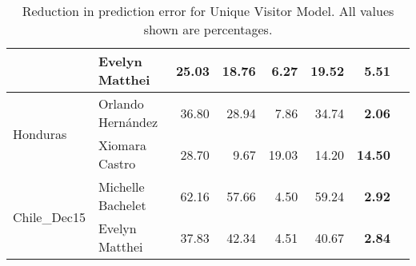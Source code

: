 \begin{table*}
\begin{tabular}{| l | l | r | r | r | r | r | r |}
														  & Evelyn Matthei & 25.03 & 18.76 & 6.27 & 19.52 & \textbf{5.51} \\
		\hline 
		\multirow{2}{*}{Honduras} & Orlando Hern\'{a}ndez & 36.80 & 28.94 & 7.86 & 34.74 & \textbf{2.06} \\\cline{2-7}
												   & Xiomara Castro & 28.70 & 9.67 & 19.03 & 14.20 & \textbf{14.50} \\
		\hline
		\multirow{2}{*}{Chile\_Dec15} & Michelle Bachelet & 62.16 & 57.66 & 4.50 & 59.24 & \textbf{2.92}\\\cline{2-7}
															& Evelyn Matthei & 37.83 & 42.34 & 4.51 & 40.67 & \textbf{2.84} \\
		\hline 											 
		\end{tabular}
		\caption{Reduction in prediction error for Unique Visitor Model. All values shown are percentages.}
		\label{table:UniVis}
	\end{table*}
